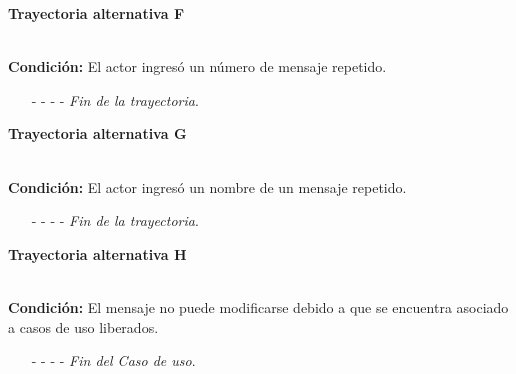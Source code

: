 \hypertarget{CU9-2:TAF}{\textbf{Trayectoria alternativa F}}\\
\noindent \textbf{Condición:} El actor ingresó un número de mensaje repetido.
\begin{enumerate}
	\UCpaso[\UCsist] Muestra el mensaje  señalando el campo que presenta la duplicidad en la pantalla .
	\UCpaso Regresa al paso \ref{CU9.2-P6} de la trayectoria principal o al paso \ref{CU9.2-AP-2} de la trayectoria Alternativa A.
	\item[- -] - - {\em {Fin de la trayectoria}}.
\end{enumerate}
\hypertarget{CU9-2:TAG}{\textbf{Trayectoria alternativa G}}\\
\noindent \textbf{Condición:} El actor ingresó un nombre de un mensaje repetido.
\begin{enumerate}
	\UCpaso[\UCsist] Muestra el mensaje  señalando el campo que presenta la duplicidad en la pantalla .
	\UCpaso Regresa al paso \ref{CU9.2-P6} de la trayectoria principal o al paso \ref{CU9.2-AP-2} de la trayectoria Alternativa A.
	\item[- -] - - {\em {Fin de la trayectoria}}.
\end{enumerate}
\hypertarget{CU9-2:TAH}{\textbf{Trayectoria alternativa H}}\\
\noindent \textbf{Condición:} El mensaje no puede modificarse debido a que se encuentra asociado a casos de uso liberados.
\begin{enumerate}
	\UCpaso[\UCsist] Oculta el botón \editar del mensaje que esta asociado a casos de uso liberados.
	\item[- -] - - {\em {Fin del Caso de uso}}.
\end{enumerate}
